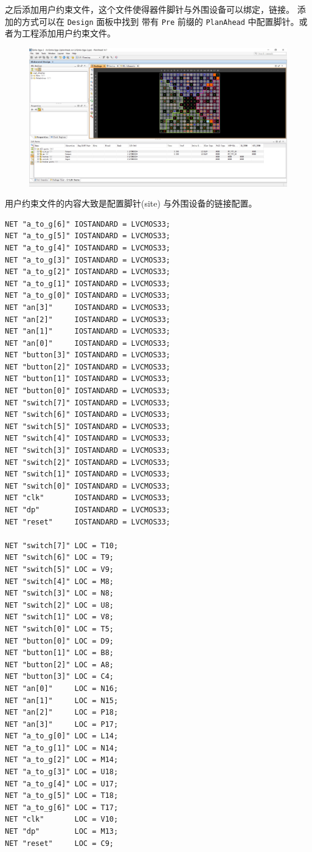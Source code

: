 \documentclass{ctexart}
\begin{document}
        之后添加用户约束文件，这个文件使得器件脚针与外围设备可以绑定，链接。
        添加的方式可以在 \verb|Design| 面板中找到 带有 \verb|Pre| 前缀的 \verb|PlanAhead| 中配置脚针。或者为工程添加用户约束文件。
        
        \begin{figure}
\centering
\includegraphics[width=1\linewidth]{report-1-io-ports-2}
\caption{}
\label{fig:report-1-io-ports-2}
\end{figure}

        
        用户约束文件的内容大致是配置脚针(site) 与外围设备的链接配置。
        
        \begin{lstlisting}
NET "a_to_g[6]" IOSTANDARD = LVCMOS33;
NET "a_to_g[5]" IOSTANDARD = LVCMOS33;
NET "a_to_g[4]" IOSTANDARD = LVCMOS33;
NET "a_to_g[3]" IOSTANDARD = LVCMOS33;
NET "a_to_g[2]" IOSTANDARD = LVCMOS33;
NET "a_to_g[1]" IOSTANDARD = LVCMOS33;
NET "a_to_g[0]" IOSTANDARD = LVCMOS33;
NET "an[3]"     IOSTANDARD = LVCMOS33;
NET "an[2]"     IOSTANDARD = LVCMOS33;
NET "an[1]"     IOSTANDARD = LVCMOS33;
NET "an[0]"     IOSTANDARD = LVCMOS33;
NET "button[3]" IOSTANDARD = LVCMOS33;
NET "button[2]" IOSTANDARD = LVCMOS33;
NET "button[1]" IOSTANDARD = LVCMOS33;
NET "button[0]" IOSTANDARD = LVCMOS33;
NET "switch[7]" IOSTANDARD = LVCMOS33;
NET "switch[6]" IOSTANDARD = LVCMOS33;
NET "switch[5]" IOSTANDARD = LVCMOS33;
NET "switch[4]" IOSTANDARD = LVCMOS33;
NET "switch[3]" IOSTANDARD = LVCMOS33;
NET "switch[2]" IOSTANDARD = LVCMOS33;
NET "switch[1]" IOSTANDARD = LVCMOS33;
NET "switch[0]" IOSTANDARD = LVCMOS33;
NET "clk"       IOSTANDARD = LVCMOS33;
NET "dp"        IOSTANDARD = LVCMOS33;
NET "reset"     IOSTANDARD = LVCMOS33;

NET "switch[7]" LOC = T10;
NET "switch[6]" LOC = T9;
NET "switch[5]" LOC = V9;
NET "switch[4]" LOC = M8;
NET "switch[3]" LOC = N8;
NET "switch[2]" LOC = U8;
NET "switch[1]" LOC = V8;
NET "switch[0]" LOC = T5;
NET "button[0]" LOC = D9;
NET "button[1]" LOC = B8;
NET "button[2]" LOC = A8;
NET "button[3]" LOC = C4;
NET "an[0]"     LOC = N16;
NET "an[1]"     LOC = N15;
NET "an[2]"     LOC = P18;
NET "an[3]"     LOC = P17;
NET "a_to_g[0]" LOC = L14;
NET "a_to_g[1]" LOC = N14;
NET "a_to_g[2]" LOC = M14;
NET "a_to_g[3]" LOC = U18;
NET "a_to_g[4]" LOC = U17;
NET "a_to_g[5]" LOC = T18;
NET "a_to_g[6]" LOC = T17;
NET "clk"       LOC = V10;
NET "dp"        LOC = M13;
NET "reset"     LOC = C9;
        \end{lstlisting}
        
\end{document}
